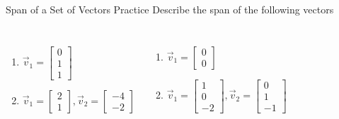 \documentclass[xcoler=dvipsnames, aspectratio=169]{beamer}
\begin{document}
    \begin{frame}{Span of a Set of Vectors Practice}
        Describe the span of the following vectors
        \vfill
        \begin{columns}
            \begin{enumerate}
                \item $\vec{v}_1 = \begin{bmatrix}
                        0\\1\\1
                \end{bmatrix}$
                \vspace{35pt}
                \item $\vec{v}_1 = \begin{bmatrix}
                        2\\1
                \end{bmatrix}, \vec{v}_2 = \begin{bmatrix}
                    -4\\-2
                \end{bmatrix}$
            \end{enumerate}
            \begin{enumerate}
                    \addtocounter{enumi}{2}
                \item $\vec{v}_1 = \begin{bmatrix}0\\0\end{bmatrix}$
                \vspace{35pt}
                \item $\vec{v}_1 = \begin{bmatrix}1\\0\\-2\end{bmatrix},
                        \vec{v}_2 = \begin{bmatrix}0\\1\\-1\end{bmatrix}$
            \end{enumerate}
        \end{columns}
    \end{frame}
\end{document}
